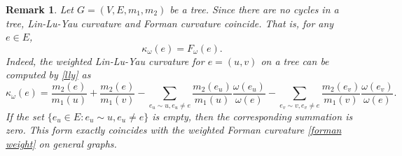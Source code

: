 \documentclass{article}
\newtheorem{remark}{Remark}
\begin{document}
\begin{remark} \label{tree}
Let $G=(V,E,m_1,m_2)$ be a tree. Since there are no cycles in a tree, Lin-Lu-Yau curvature and Forman curvature coincide. That is, for any $e\in E$,
\begin{equation*}\label{kappa}
    \kappa_\omega (e) = F_\omega (e).
\end{equation*}
Indeed, the weighted Lin-Lu-Yau curvature for $e=(u,v)$ on a tree can be computed by \eqref{lly} as
\begin{equation}\label{1-dim}
  \kappa_{\omega}(e)=\frac{m_2(e)}{m_1(u)}+\frac{m_2(e)}{m_1(v)}-\sum_{e_u\sim u,e_u\neq e}\frac{m_2(e_u)}{m_1(u)}\frac{\omega(e_u)}{\omega(e)}-\sum_{e_v\sim v,e_v\neq e}\frac{m_2(e_v)}{m_1(v)}\frac{\omega(e_v)}{\omega(e)}.  
\end{equation}
If the set $\{e_u\in E: e_u\sim u,e_u\neq e\}$ is empty, then the corresponding summation is zero. This form exactly coincides with the weighted Forman curvature \eqref{forman weight} on general graphs.
\end{remark}

\end{document}

